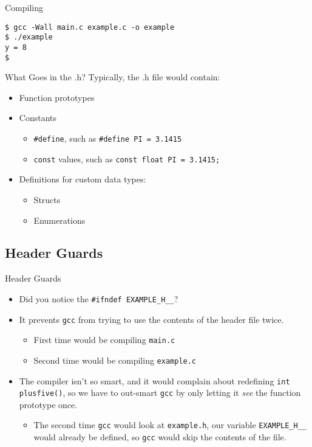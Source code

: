 \documentclass[graphics]{beamer}
\begin{document}
\begin{frame}[fragile]{Compiling}
    \begin{verbatim}
$ gcc -Wall main.c example.c -o example
$ ./example
y = 8
$
    \end{verbatim}
\end{frame}

\begin{frame}{What Goes in the .h?}
    Typically, the .h file would contain:
    \begin{itemize}
        \item Function prototypes
        \item Constants
        \begin{itemize}
            \item \texttt{\#define}, such as \texttt{\#define PI = 3.1415}
            \item \texttt{const} values, such as \texttt{const float PI = 3.1415;}
        \end{itemize}
        \item Definitions for custom data types:
        \begin{itemize}
            \item Structs
            \item Enumerations
        \end{itemize}
    \end{itemize}
\end{frame}

\subsection{Header Guards}
\begin{frame}{Header Guards}
    \begin{itemize}
        \item Did you notice the \texttt{\#ifndef EXAMPLE\_H\_\_}?
        \item It prevents \texttt{gcc} from trying to use the contents of the header file twice.
        \begin{itemize}
            \item First time would be compiling \texttt{main.c}
            \item Second time would be compiling \texttt{example.c}
        \end{itemize}
        \item The compiler isn't so smart, and it would complain about redefining \texttt{int plusfive()}, so we have to out-smart \texttt{gcc} by only letting it \textit{see} the function prototype once.
        \begin{itemize}
            \item The second time \texttt{gcc} would look at \texttt{example.h}, our variable \texttt{EXAMPLE\_H\_\_} would already be defined, so \texttt{gcc} would skip the contents of the file.
        \end{itemize}
    \end{itemize}
\end{frame}
\end{document}

